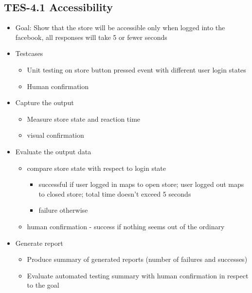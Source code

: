 \subsection{TES-4.1 Accessibility}
\begin{itemize}
\item Goal: Show that the store will be accessible only when logged into the facebook, all responses will take 5 or fewer seconds

\item Testcases
\begin{itemize}
\item Unit testing on store button pressed event with different user login states
\item Human confirmation
\end{itemize}

\item Capture the output
\begin{itemize}
\item Measure store state and reaction time
\item visual confirmation
\end{itemize}

\item Evaluate the output data
\begin{itemize}
\item compare store state with respect to login state
\begin{itemize}
\item successful if user logged in maps to open store; user logged out maps to closed store; total time doesn’t exceed 5 seconds
\item failure otherwise
\end{itemize}
\item human confirmation - success if nothing seems out of the ordinary
\end{itemize}

\item Generate report
\begin{itemize}
\item Produce summary of generated reports (number of failures and successes)
\item Evaluate automated testing summary with human confirmation in respect to the goal
\end{itemize}
\end{itemize}


